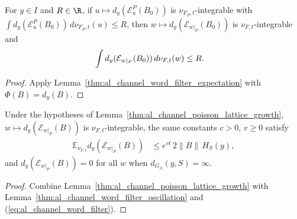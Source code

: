 \begin{lemma}
    \label{thm:al_channel_word_filter_oscillation}
    \leanok
    For $y\in I$ and $R\in\R$, if $u\mapsto d_y(\mathcal E^P_u(B_0))$ is
    $\nu_{F_P,t}$-integrable with $\int d_y(\mathcal E^P_u(B_0))\,d\nu_{F_P,t}(u)\le R$,
    then $w\mapsto d_y(\mathcal E_{w|_P}(B_0))$ is $\nu_{F,t}$-integrable and
    \begin{align}
        \int d_y(\mathcal E_{w|_P}(B_0))\,d\nu_{F,t}(w)
         & \leq R. \notag
    \end{align}
\end{lemma}
\begin{proof}
    \leanok
    Apply Lemma~\ref{thm:al_channel_word_filter_expectation} with
    $\Phi(B)=d_y(B)$.
\end{proof}

\begin{lemma}
    \label{thm:al_channel_poisson_lattice_filter_growth}
    \leanok
    Under the hypotheses of
    Lemma~\ref{thm:al_channel_poisson_lattice_growth},
    $w\mapsto d_y(\mathcal E_{w|_P}(B))$ is $\nu_{F,t}$-integrable, the same
    constants $c>0$, $v\ge0$ satisfy
    \begin{align}
        \label{eq:al_poisson_lattice_filtered_decay}
        \mathbb E_{\nu_{F,t}}d_y(\mathcal E_{w|_P}(B))
         & \le e^{vt}\,2\|B\|\,H_S(y),
    \end{align}
    and $d_y(\mathcal E_{w|_P}(B))=0$ for all $w$ when
    $d_{G_\Lambda}(y,S)=\infty$.
\end{lemma}
\begin{proof}
    \leanok
    Combine Lemma~\ref{thm:al_channel_poisson_lattice_growth} with
    Lemma~\ref{thm:al_channel_word_filter_oscillation} and
    (\ref{eq:al_channel_word_filter}).
\end{proof}
